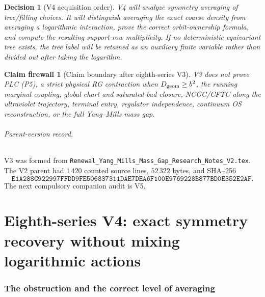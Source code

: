 \documentclass[11pt,oneside]{book}
\newtheorem{firewall}[theorem]{Claim firewall}
\newtheorem{decision}[theorem]{Decision}
\theoremstyle{definition}
\theoremstyle{remark}
\begin{document}
\begin{decision}[V4 acquisition order]
\label{dec:e8v3-V4}
V4 will analyze symmetry averaging of tree/filling choices.  It will
distinguish averaging the exact coarse density from averaging a
logarithmic interaction, prove the correct orbit-ownership formula,
and compute the resulting support-row multiplicity.  If no
deterministic equivariant tree exists, the tree label will be retained
as an auxiliary finite variable rather than divided out after taking
the logarithm.
\end{decision}

\begin{firewall}[Claim boundary after eighth-series V3]
\label{fire:e8v3-claim}
V3 does not prove PLC (P5), a strict physical RG contraction when
\(D_{\rm geom}\geq b^2\), the running marginal coupling, global chart
and saturated-bad closure, NCGC/CFTC along the ultraviolet trajectory,
terminal entry, regulator independence, continuum OS reconstruction,
or the full Yang--Mills mass gap.
\end{firewall}

\paragraph{Parent-version record.}
V3 was formed from
\texttt{Renewal\_Yang\_Mills\_Mass\_Gap\_Research\_Notes\_V2.tex}.
The V2 parent had \(1\,420\) counted source lines,
\(52\,322\) bytes, and SHA--256
\[
 \texttt{E1A288C922997FFDD9FE506837311DAE7DEA6F100E9769228B877BD0E352E2AF}.
\]
The next compulsory companion audit is V5.



\part{Eighth-series V4: exact symmetry recovery without mixing
logarithmic actions}
\label{part:e8v4}

\section{The obstruction and the correct level of averaging}
\label{sec:e8v4-obstruction}
\end{document}
